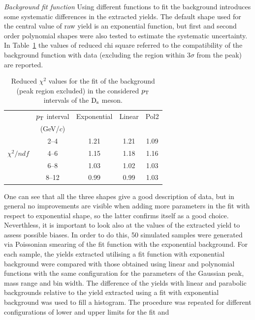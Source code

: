 \emph{Background fit function}
Using different functions to fit the background introduces 
some systematic differences in the extracted yields.
The default shape used for the central value of raw yield is an 
exponential function, but first and second 
order polynomial shapes were also tested to estimate the systematic 
uncertainty. In Table~\ref{tab:chi2bkg} 
the values of reduced chi square referred to the compatibility 
of the background function with data (excluding the region within 3$\sigma$ from the peak) are 
reported. 
\begin{table}[!h]
\centering
\vspace{0.5cm}
\begin{tabular}{|c|c|c|c|c|} 
\hline \rule{0pt}{2.7ex}
 & $p_{\rm T}$ interval & Exponential & Linear & Pol2 \\ 
 &(GeV/$c$) & & &  \\ 
\hline \rule{0pt}{2.7ex}
           &\phantom{0}2--4\phantom{0} & 1.21 & 1.21 & 1.09\\
           $\chi^2/ndf$ &\phantom{0}4--6\phantom{0} & 1.15 & 1.18 & 1.16\\
          &\phantom{0}6--8\phantom{0} & 1.03 & 1.02 & 1.03\\
           &\phantom{0}8--12 & 0.99 & 0.99  & 1.03\\
\hline
\end{tabular}
\caption{Reduced $\chi^2$ values for the fit of the background (peak region excluded) in the
considered $p_{\rm T}$ intervals of the ${\rm D_s}$ meson.} 
\label{tab:chi2bkg}
\end{table}
One can see that all the three shapes 
give a good description of data, but in general no improvements 
are visible when adding more parameters in the fit
with respect to exponential shape, so the latter confirms itself as a good choice.
Neverthless, it is important to look also at the values of the 
extracted yield to assess possible biases.
 In order to do this, 50 simulated samples were generated via 
 Poissonian smearing of the fit function with the exponential background.
 For each sample, the yields extracted utilising a fit function with exponential 
 background were compared with those obtained using linear and 
 polynomial functions with the same
configuration for the parameters of the Gaussian peak, mass range and bin width. The
difference of the yields with linear and parabolic backgrounds relative to 
the yield extracted using a fit with exponential background 
was used to fill a histogram. The procedure was repeated for different
configurations of lower and upper limits for the fit and 
